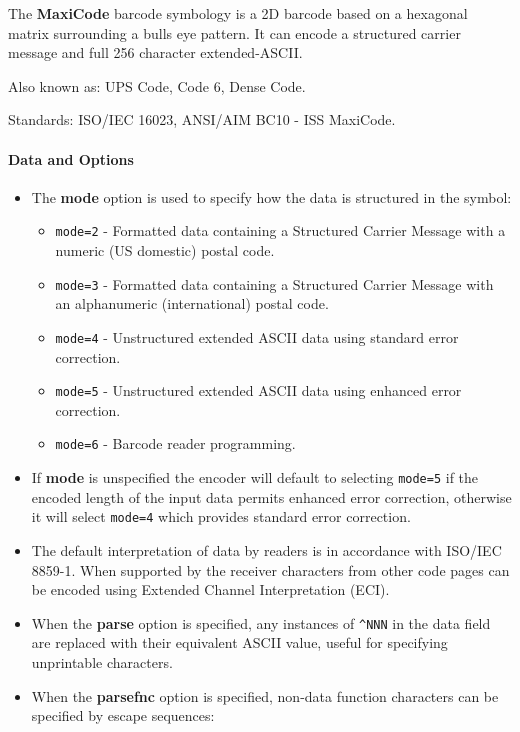 The \textbf{MaxiCode} barcode symbology is a 2D barcode based on a
hexagonal matrix surrounding a bulls eye pattern. It can encode a
structured carrier message and full 256 character extended-ASCII.

Also known as: UPS Code, Code 6, Dense Code.

Standards: ISO/IEC 16023, ANSI/AIM BC10 - ISS MaxiCode.

\hypertarget{data-and-options-46}{%
\paragraph{Data and Options}\label{data-and-options-46}}

\begin{itemize}
\tightlist
\item
  The \textbf{mode} option is used to specify how the data is structured
  in the symbol:

  \begin{itemize}
  \tightlist
  \item
    \texttt{mode=2} - Formatted data containing a Structured Carrier
    Message with a numeric (US domestic) postal code.
  \item
    \texttt{mode=3} - Formatted data containing a Structured Carrier
    Message with an alphanumeric (international) postal code.
  \item
    \texttt{mode=4} - Unstructured extended ASCII data using standard
    error correction.
  \item
    \texttt{mode=5} - Unstructured extended ASCII data using enhanced
    error correction.
  \item
    \texttt{mode=6} - Barcode reader programming.
  \end{itemize}
\item
  If \textbf{mode} is unspecified the encoder will default to selecting
  \texttt{mode=5} if the encoded length of the input data permits
  enhanced error correction, otherwise it will select \texttt{mode=4}
  which provides standard error correction.
\item
  The default interpretation of data by readers is in accordance with
  ISO/IEC 8859-1. When supported by the receiver characters from other
  code pages can be encoded using Extended Channel Interpretation (ECI).
\item
  When the \textbf{parse} option is specified, any instances of
  \texttt{\^{}NNN} in the data field are replaced with their equivalent
  ASCII value, useful for specifying unprintable characters.
\item
  When the \textbf{parsefnc} option is specified, non-data function
  characters can be specified by escape sequences:


\end{itemize}
